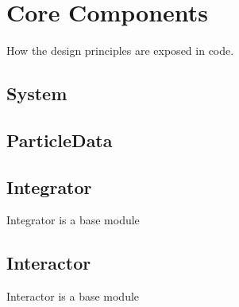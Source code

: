 \chapter{Core Components}\label{ch:core}
How the design principles are exposed in code.
\section{System}
\section{ParticleData}
\section{Integrator}\label{sec:Integrator}
Integrator is a base module

\section{Interactor} \label{sec:interactor}
Interactor is a base module



